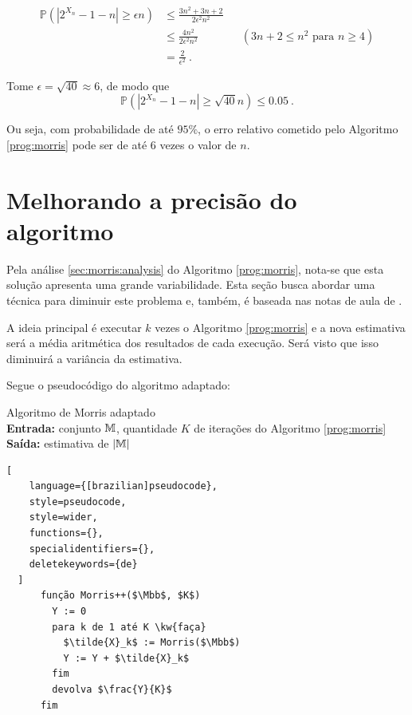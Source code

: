 \begin{align*}
  \mathbb{P}(|2^{X_n} - 1 - n| \geq \epsilon n) 
    &\leq \frac{3n^2 + 3n + 2}{2 \epsilon^2 n^2}  \\
    &\leq \frac{4n^2}{2 \epsilon^2 n^2}  &&(\text{$3n + 2 \leq n^2$ para $n \geq 4$}) \\
    &= \frac{2}{\epsilon^2} \ .
\end{align*}

Tome $\epsilon = \sqrt{40} \approx 6 $, de modo que 
\[ \mathbb{P}(|2^{X_n} - 1 - n| \geq \sqrt{40} n)  \leq 0.05 \ . \]

Ou seja, com probabilidade de até $95\%$, o erro relativo cometido pelo Algoritmo \ref{prog:morris} pode ser de até $6$ vezes o valor de $n$.


\section{Melhorando a precisão do algoritmo}
\label{sec:morris:plus}

Pela análise \ref{sec:morris:analysis} do Algoritmo \ref{prog:morris}, nota-se que esta solução apresenta uma grande variabilidade. 
Esta seção busca abordar uma técnica para diminuir este problema e, também, é baseada nas notas de aula de \citep{LectureNotesAndoni}.

A ideia principal é executar $k$ vezes o Algoritmo \ref{prog:morris} e a nova estimativa será a média aritmética dos resultados
de cada execução. Será visto que isso diminuirá a variância da estimativa.

Segue o pseudocódigo do algoritmo adaptado:
\begin{programruledcaption}{
Algoritmo de Morris adaptado\label{prog:morris:plus}
\\ \textbf{Entrada:} conjunto $\mathbb{M}$, quantidade $K$ de iterações do Algoritmo \ref{prog:morris} 
\\ \textbf{Saída:} estimativa de $|\mathbb{M}|$
\label{prog:flajolet-martin}
}
  \begin{lstlisting}[
    language={[brazilian]pseudocode},
    style=pseudocode,
    style=wider,
    functions={},
    specialidentifiers={},
    deletekeywords={de}
  ]
      função Morris++($\Mbb$, $K$)
        Y := 0
        para k de 1 até K \kw{faça}
          $\tilde{X}_k$ := Morris($\Mbb$)
          Y := Y + $\tilde{X}_k$
        fim
        devolva $\frac{Y}{K}$
      fim
  \end{lstlisting}
\end{programruledcaption}

